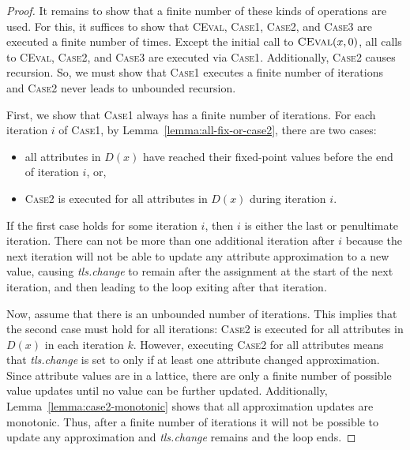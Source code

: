 {\begin{proof}
  It remains to show that a finite number of these kinds of operations are used. For this, it
  suffices to show that \textsc{CEval}, \textsc{Case1}, \textsc{Case2}, and \textsc{Case3} are
  executed a finite number of times.  Except the initial call to $\textsc{CEval}(x, 0)$, all calls to
  \textsc{CEval}, \textsc{Case2}, and \textsc{Case3} are executed via \textsc{Case1}. Additionally,
  \textsc{Case2} causes recursion.  So, we must show that \textsc{Case1} executes a finite number of
  iterations and \textsc{Case2} never leads to unbounded recursion.

  First, we show that \textsc{Case1} always has a finite number of iterations.
  For each iteration $i$ of \textsc{Case1}, by Lemma~\ref{lemma:all-fix-or-case2}, there are two cases:

  \begin{itemize}
    \item all attributes in $D(x)$ have reached their fixed-point values
      before the end of iteration $i$, or,
    \item \textsc{Case2} is executed for all attributes in $D(x)$ during iteration $i$.
  \end{itemize}

  If the first case holds for some iteration $i$, then $i$ is either the last or penultimate
  iteration.  There can not be more than one additional iteration after $i$ because the next
  iteration will not be able to update any attribute approximation to a new value, causing
  \emph{tls.change} to remain \false{} after the assignment at the start of the next iteration,
  and then leading to the loop exiting after that iteration.

  Now, assume that there is an unbounded number of iterations. This implies that
  the second case must hold for all iterations:
  \textsc{Case2} is executed for all attributes in $D(x)$ in each iteration $k$.
  However, executing \textsc{Case2} for all attributes means that \emph{tls.change} is set to
  \true{}
  only if at least one attribute changed approximation.
  Since attribute values are in a lattice, there are only a finite number of possible value updates
  until no value can be further updated. Additionally, Lemma~\ref{lemma:case2-monotonic} shows that
  all approximation updates are monotonic.
  Thus, after a finite number of
  iterations it will not be possible to update any approximation and \emph{tls.change} remains
  \false{} and the loop ends.


\end{proof}}
